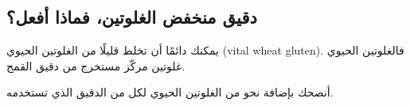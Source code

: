 \subsection{دقيق منخفض الغلوتين، فماذا أفعل؟}

يمكنك دائمًا أن تخلط قليلًا من الغلوتين الحيوي \textenglish{(vital wheat gluten)}. فالغلوتين الحيوي غلوتين مركّز مستخرج من دقيق القمح.

أنصحك بإضافة نحو  من الغلوتين الحيوي لكل  من الدقيق الذي تستخدمه.
